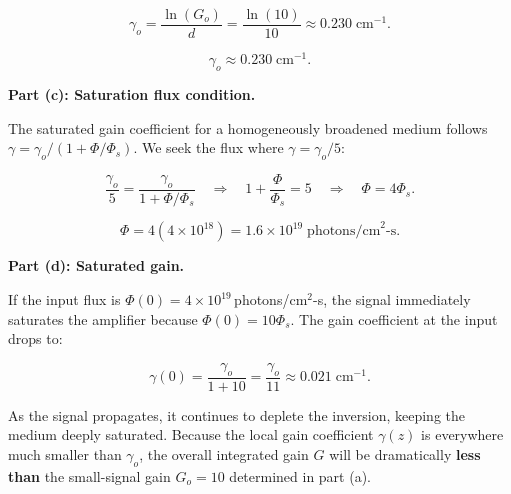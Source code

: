 \begin{equation*}
  \gamma_o = \frac{\ln(G_o)}{d} = \frac{\ln(10)}{10} \approx 0.230\;\text{cm}^{-1}.
\end{equation*}

\begin{equation*}
  \boxed{\gamma_o \approx 0.230\;\text{cm}^{-1}.}
\end{equation*}

\textbf{Part (c): Saturation flux condition.}

The saturated gain coefficient for a homogeneously broadened medium follows $\gamma = \gamma_o / (1 + \Phi/\Phi_s)$. We seek the flux where $\gamma = \gamma_o / 5$:

\begin{equation*}
  \frac{\gamma_o}{5} = \frac{\gamma_o}{1 + \Phi/\Phi_s} \quad\Longrightarrow\quad
  1 + \frac{\Phi}{\Phi_s} = 5 \quad\Longrightarrow\quad \Phi = 4\Phi_s.
\end{equation*}

\begin{equation*}
  \boxed{\Phi = 4(4\times10^{18}) = 1.6\times10^{19}\;\text{photons/cm}^{2}\text{-s}.}
\end{equation*}

\textbf{Part (d): Saturated gain.}

If the input flux is $\Phi(0) = 4\times10^{19}$\,photons/cm$^2$-s, the signal immediately saturates the amplifier because $\Phi(0) = 10\Phi_s$. The gain coefficient at the input drops to:

\begin{equation*}
  \gamma(0) = \frac{\gamma_o}{1 + 10} = \frac{\gamma_o}{11} \approx 0.021\;\text{cm}^{-1}.
\end{equation*}

As the signal propagates, it continues to deplete the inversion, keeping the medium deeply saturated. Because the local gain coefficient $\gamma(z)$ is everywhere much smaller than $\gamma_o$, the overall integrated gain $G$ will be dramatically \textbf{less than} the small-signal gain $G_o=10$ determined in part (a).


